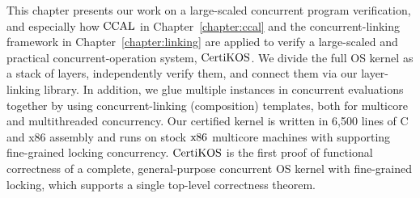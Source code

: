 

This chapter presents our work on a large-scaled concurrent program verification, and
especially 
how $\mathrm{CCAL}$ in Chapter~\ref{chapter:ccal} and the concurrent-linking framework in Chapter~\ref{chapter:linking} are applied 
to verify a large-scaled and practical concurrent-operation system, $\mathrm{CertiKOS}$.
We divide the full OS kernel as a stack of layers, independently verify them, 
and connect them via our layer-linking library. 
In addition,
we glue multiple instances in concurrent evaluations together by using concurrent-linking (composition) templates, both for multicore and  multithreaded concurrency.  
Our certified kernel is written in 6,500 lines of C and x86 assembly
and runs on stock $\mathrm{x86}$ multicore machines with supporting fine-grained locking concurrency. 
$\mathrm{CertiKOS}$ is the first proof of functional correctness of a complete,
general-purpose concurrent OS kernel with fine-grained locking,
which supports a single top-level correctness theorem. 

